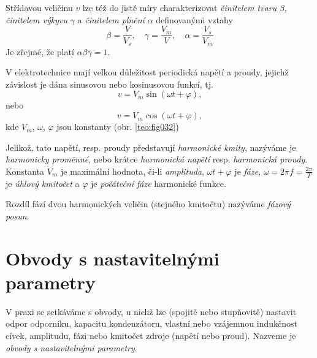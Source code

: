     Střídavou veličinu $v$ lze též do jisté míry charakterizovat \emph{činitelem tvaru} $\beta$,
    \emph{činitelem výkyvu} $\gamma$ a \emph{činitelem plnění} $\alpha$ definovanými vztahy
    \begin{equation}\label{TEO:eq_harm07}
      \beta = \frac{V}{V_s}, \quad \gamma = \frac{V_m}{V}, \quad \alpha = \frac{V_s}{V_m}
    \end{equation}    
    Je zřejmé, že platí $\alpha\beta\gamma = 1$.
    
    V elektrotechnice mají velkou důležitost periodická napětí a proudy, jejichž závislost je dána
    sinusovou nebo kosinusovou funkcí, tj.
    \begin{equation}\label{TEO:eq_harm08}
      v = V_m\sin(\omega t + \varphi),
    \end{equation}        
    nebo
    \begin{equation}\label{TEO:eq_harm09}
      v = V_m\cos(\omega t + \varphi),
    \end{equation}  
    kde $V_m$, $\omega$, $\varphi$ jsou konstanty (obr. \ref{teo:fig032})
    
    Jelikož, tato napětí, resp. proudy představují \emph{harmonické kmity}, nazýváme je
    \emph{harmonicky proměnné}, nebo krátce \emph{harmonická napětí} resp. \emph{harmonická
    proudy}. Konstanta $V_m$ je maximální hodnota, či-li \emph{amplituda}, $\omega t + \varphi$ je
    \emph{fáze}, $\omega = 2\pi f = \frac{2\pi}{T}$ je \emph{úhlový kmitočet} a $\varphi$ je
    \emph{počáteční fáze} harmonické funkce.
    
    Rozdíl fází dvou harmonických veličin (stejného kmitočtu) nazýváme \emph{fázový posun}.
    
      
      
  \section{Obvody s nastavitelnými parametry}
    V praxi se setkáváme s obvody, u nichž lze (spojitě nebo stupňovitě) nastavit odpor odporníku, 
    kapacitu kondenzátoru, vlastní nebo vzájemnou indukčnost cívek, amplitudu, fázi nebo kmitočet
    zdroje (napětí nebo proud). Nazveme je \emph{obvody s nastavitelnými parametry}.

\printbibliography[title={Seznam literatury}, heading=subbibliography]
